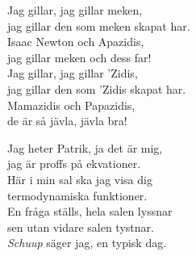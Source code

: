 \documentclass[a6paper, 10pt, twoside]{article}
\begin{document}
\vspace{-10pt}

\noindent
\begin{center}
\end{center}
\begin{lyrics}
Jag gillar, jag gillar meken, \\
jag gillar den som meken skapat har. \\
Isaac Newton och Apazidis, \\
jag gillar meken och dess far!
\vspace{5pt} \\
Jag gillar, jag gillar 'Zidis, \\
jag gillar den som 'Zidis skapat har. \\
Mamazidis och Papazidis, \\
de är så jävla, jävla bra!
\end{lyrics}

\vspace{20pt}
\begin{center}
\end{center}
\begin{lyrics}
Jag heter Patrik, ja det är mig, \\
jag är proffs på ekvationer. \\
Här i min sal ska jag visa dig \\
termodynamiska funktioner. \\
En fråga ställs, hela salen lyssnar \\
sen utan vidare salen tystnar. \\
\textit{Schuup} säger jag, en typisk dag. 
\end{lyrics}
\end{document}
